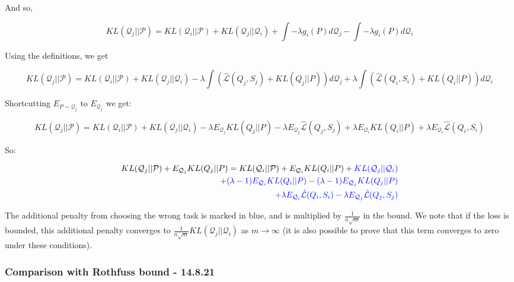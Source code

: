\documentclass[letterpaper]{article}
\theoremstyle{definition}
\begin{document}
And so,

$$ KL(\mathcal{Q}_j||\mathcal{P}) = KL(\mathcal{Q}_i||\mathcal{P}) + KL(\mathcal{Q}_j||\mathcal{Q}_i) +  \int -\lambda g_i(P) d\mathcal{Q}_j - \int -\lambda g_i(P) d\mathcal{Q}_i$$

Using the definitions, we get


$$ KL(\mathcal{Q}_j||\mathcal{P}) = KL(\mathcal{Q}_i||\mathcal{P}) + KL(\mathcal{Q}_j||\mathcal{Q}_i) -\lambda  \int  (\hat{\mathcal{L}}(Q_j,S_j)+ KL(Q_j||P)) d\mathcal{Q}_j + \lambda \int (\hat{\mathcal{L}}(Q_i,S_i)+ KL(Q_i||P)) d\mathcal{Q}_i$$

Shortcutting $E_{P\sim \mathcal{Q}_j}$ to $E_{\mathcal{Q}_j}$ we get:

$$ KL(\mathcal{Q}_j||\mathcal{P}) = KL(\mathcal{Q}_i||\mathcal{P}) + KL(\mathcal{Q}_j||\mathcal{Q}_i) -\lambda E_{\mathcal{Q}_j} KL(Q_j||P) -\lambda E_{\mathcal{Q}_j} \hat{\mathcal{L}}(Q_j,S_j)   + \lambda E_{\mathcal{Q}_i} KL(Q_i||P) +\lambda E_{\mathcal{Q}_i} \hat{\mathcal{L}}(Q_i,S_i)$$

So: 

\begin{equation*}
\begin{split}
KL(\mathcal{Q}_j||\mathcal{P}) + E_{\mathcal{Q}_j} KL(Q_j||P)= KL(\mathcal{Q}_i||\mathcal{P})  +  E_{\mathcal{Q}_i} KL(Q_i||P) + \textcolor{blue}{KL(\mathcal{Q}_j||\mathcal{Q}_i)} \\
 \textcolor{blue}{+(\lambda-1) E_{\mathcal{Q}_i} KL(Q_i||P) - (\lambda-1) E_{\mathcal{Q}_j} KL(Q_j||P)} \\
\textcolor{blue}{+\lambda E_{\mathcal{Q}_i} \hat{\mathcal{L}}(Q_i,S_i)
    -\lambda E_{\mathcal{Q}_j} \hat{\mathcal{L}}(Q_j,S_j)    }
\end{split}
\end{equation*}

The additional penalty from choosing the wrong task is marked in blue, and is multiplied by $\frac{1}{n\sqrt{m}}$ in the bound. We note that if the loss is bounded, this additional penalty converges to $\frac{1}{n\sqrt{m}}KL(\mathcal{Q}_j||\mathcal{Q}_i)$  as $m\rightarrow\infty$ (it is also possible to prove that this term converges to zero under these conditions).

\subsubsection*{Comparison with Rothfuss bound - 14.8.21}
\end{document}

